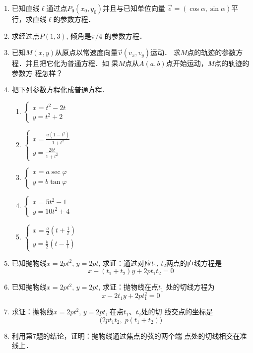 \begin{enumerate}
\item 已知直线$\ell$通过点$P_0(x_0,y_0)$并且与已知单位向量
$\vec{e}=(\cos\alpha,\sin\alpha)$平行，求直线$\ell$的参数方程．
\item 求经过点$P(1,3)$, 倾角是$\pi/4$
的参数方程．
\item 已知$M(x,y)$从原点以常速度向量$\vec{v}(v_x,v_y)$运动．
求$M$点的轨迹的参数方程．并且把它化为普通方程．如
果$M$点从$A(a,b)$点开始运动，$M$点的轨迹的参数方
程怎样？
\item 把下列参数方程化成普通方程．
\begin{multicols}{2}
\begin{enumerate}
    \item $\begin{cases}
        x=t^2-2t\\y=t^2+2
    \end{cases}$
    \item $\begin{cases}
        x=\frac{a(1-t^2)}{1+t^2}\\
        y=\frac{2bt}{1+t^2}
    \end{cases}$
    \item $\begin{cases}
        x=a\sec\varphi\\
        y=b\tan\varphi
    \end{cases}$
    \item $\begin{cases}
        x=5t^2-1\\y=10t^2+4
    \end{cases}$
    \item $\begin{cases}
        x=\frac{a}{2}\left(t+\frac{1}{t}\right)\\
        y=\frac{b}{2}\left(t-\frac{1}{t}\right)
    \end{cases}$
\end{enumerate}
\end{multicols}
\item 已知抛物线$x=2pt^2$, $y=2pt$, 求证：通过对应$t_1$,
$t_2$两点的直线方程是
\[x-(t_1+t_2)y+2pt_1t_2=0\]
\item 已知抛物线$x=2pt^2$, $y=2pt$, 求证：抛物线在点$t_1$
处的切线方程为
\[x-2t_1y+2pt_1^2=0\]
\item 求证：抛物线$x=2pt^2$, $y=2pt$, 在点$t_1$、$t_2$处的切
线交点的坐标是
\[\big(2pt_1t_2,\; p(t_1+t_2)\big)\]
\item 利用第7题的结论，证明：抛物线通过焦点的弦的两个端
点处的切线相交在准线上．

\end{enumerate}

